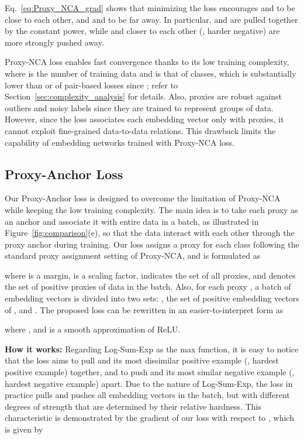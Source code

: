 \documentclass[10pt,twocolumn,letterpaper]{article}
\begin{document}
Eq.~\eqref{eq:Proxy_NCA_grad} shows that minimizing the loss encourages  and  to be close to each other, and  and  to be far away.
In particular,  and  are pulled together by the constant power, while  and  closer to each other (\ie, harder negative) are more strongly pushed away.



Proxy-NCA loss enables fast convergence thanks to its low training complexity,  where  is the number of training data and  is that of classes, which is substantially lower than  or  of pair-based losses since ; refer to Section~\ref{sec:complexity_analysis} for details.
Also, proxies are robust against outliers and noisy labels since they are trained to represent groups of data.
However, since the loss associates each embedding vector only with proxies, it cannot exploit fine-grained data-to-data relations.
This drawback limits the capability of embedding networks trained with Proxy-NCA loss. 




\subsection{Proxy-Anchor Loss}
\label{sec:proxy_anchor}
Our Proxy-Anchor loss is designed to overcome the limitation of Proxy-NCA while keeping the low training complexity.
The main idea is to take each proxy as an anchor and associate it with entire data in a batch, as illustrated in Figure~\ref{fig:comparison}(e), so that the data interact with each other through the proxy anchor during training.
Our loss assigns a proxy for each class following the standard proxy assignment setting of Proxy-NCA, and is formulated as

where  is a margin,  is a scaling factor,  indicates the set of all proxies, and  denotes the set of positive proxies of data in the batch.
Also, for each proxy , a batch of embedding vectors  is divided into two sets: , the set of positive embedding vectors of , and .
The proposed loss can be rewritten in an easier-to-interpret form as

where , and is a smooth approximation of ReLU.

\vspace{2mm}
\noindent \textbf{How it works:}
Regarding Log-Sum-Exp as the max function, it is easy to notice that the loss aims to pull  and its most dissimilar positive example (\ie, hardest positive example) together, and to push  and its most similar negative example (\ie, hardest negative example) apart.
Due to the nature of Log-Sum-Exp, 
the loss in practice pulls and pushes all embedding vectors in the batch, but with different degrees of strength that are determined by their relative hardness. 
This characteristic is demonstrated by the gradient of our loss with respect to , which is given by
\iffalse
\end{document}
